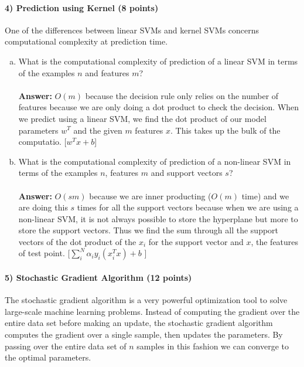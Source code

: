 \documentclass[11pt]{article}
\begin{document}
\paragraph{4) Prediction using Kernel (8 points)} 
One of the differences between linear SVMs and kernel SVMs concerns computational complexity at prediction time.
\begin{enumerate}[(a)]
\item What is the computational complexity of prediction of a linear SVM in terms of the examples $n$ and features $m$?
\\ \\
{\bf Answer: }
$O(m)$ because the decision rule only relies on the number of features because we are only doing a dot product to check the decision. When we predict using a linear SVM, we find the dot product of our model parameters $w^T$ and the given $m$ features $x$. This takes up the bulk of the computatio. [$w^Tx + b$]

\item What is the computational complexity of prediction of a non-linear SVM in terms of the examples $n$, features $m$ and support vectors $s$?
\\ \\
{\bf Answer: }
$O(sm)$ because we are inner producting ($O(m)$ time) and we are doing this $s$ times for all the support vectors because when we are using a non-linear SVM, it is not always possible to store the hyperplane but more to store the support vectors. Thus we find the sum through all the support vectors of the dot product of the $x_i$ for the support vector and $x$, the features of test point.  [$\sum_i^N{\alpha_i y_i (x_i^T x) + b}$ ]
\end{enumerate}








\newpage
\paragraph{5) Stochastic Gradient Algorithm (12 points)}

The stochastic gradient algorithm is a very powerful optimization tool to solve large-scale machine learning problems. Instead of computing the gradient over the entire data set before making an update, the stochastic gradient algorithm computes the gradient over a single sample, then updates the parameters. By passing over the entire data set of $n$ samples in this fashion we can converge to the optimal parameters.
\end{document}
